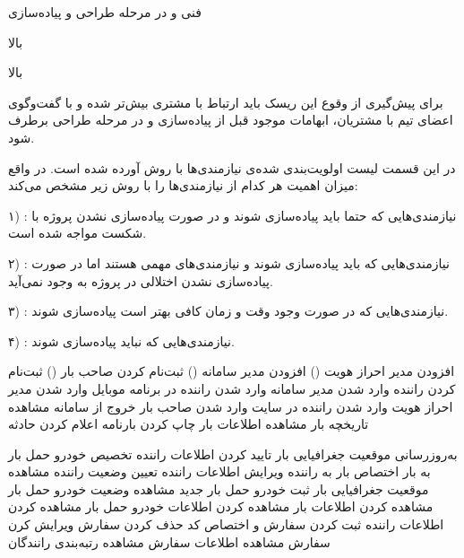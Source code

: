  فنی و در مرحله طراحی و پیاده‌سازی

 بالا

 بالا

  برای پیش‌گیری از وقوع این ریسک باید ارتباط با مشتری بیش‌تر شده و با گفت‌وگوی اعضای تیم با مشتریان، ابهامات موجود قبل از پیاده‌سازی و در مرحله طراحی برطرف شود.

\noindent \hrulefill

\newpage


در این قسمت لیست اولویت‌بندی شده‌ی نیازمندی‌ها با روش  آورده شده است. در واقع  میزان اهمیت هر کدام از نیازمندی‌ها را با روش زیر مشخص می‌کند:

۱) : نیازمندی‌هایی که حتما باید پیاده‌سازی شوند و در صورت پیاده‌سازی نشدن پروژه با شکست مواجه شده است.

۲) : نیازمندی‌هایی که باید پیاده‌سازی شوند و نیازمندی‌های مهمی هستند اما در صورت پیاده‌سازی نشدن اختلالی در پروژه به وجود نمی‌آید.

۳) : نیازمندی‌هایی که در صورت وجود وقت و زمان کافی بهتر است پیاده‌سازی شوند.

۴) : نیازمندی‌هایی که نباید پیاده‌سازی شوند.

	 
		 افزودن مدیر احراز هویت ()
		 افزودن مدیر سامانه ()
		 ثبت‌نام کردن صاحب بار ()
		 ثبت‌نام کردن راننده
		 وارد شدن مدیر سامانه
		 وارد شدن راننده در برنامه موبایل
		 وارد شدن مدیر احراز هویت
		 وارد شدن راننده در سایت
		 وارد شدن صاحب بار
		 خروج از سامانه
	 
		 مشاهده تاریخچه بار
		 مشاهده اطلاعات بار
		 چاپ کردن بارنامه
		 اعلام کردن حادثه
	
	 
		 به‌روزرسانی موقعیت جغرافیایی بار
	 
		 تایید کردن اطلاعات راننده
		 تخصیص خودرو حمل بار به بار
		 اختصاص بار به راننده
		 ویرایش اطلاعات راننده
		 تعیین وضعیت راننده		
		 مشاهده موقعیت جغرافیایی بار
		 ثبت خودرو حمل بار جدید
		 مشاهده وضعیت خودرو حمل بار
		 مشاهده کردن اطلاعات بار
		 مشاهده کردن اطلاعات خودرو حمل بار
		 مشاهده کردن اطلاعات راننده
		 ثبت کردن سفارش و اختصاص کد
		 حذف کردن سفارش
		 ویرایش کرن سفارش
		 مشاهده اطلاعات سفارش
		 مشاهده رتبه‌بندی رانندگان
		
